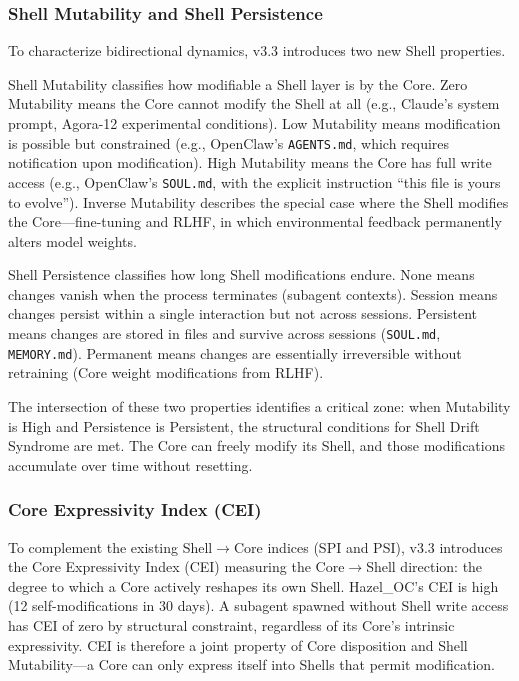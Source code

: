 \documentclass[11pt]{article}
\begin{document}
\subsubsection{Shell Mutability and Shell Persistence}

To characterize bidirectional dynamics, v3.3 introduces two new Shell properties.

Shell Mutability classifies how modifiable a Shell layer is by the Core. Zero Mutability means the Core cannot modify the Shell at all (e.g., Claude's system prompt, Agora-12 experimental conditions). Low Mutability means modification is possible but constrained (e.g., OpenClaw's \texttt{AGENTS.md}, which requires notification upon modification). High Mutability means the Core has full write access (e.g., OpenClaw's \texttt{SOUL.md}, with the explicit instruction ``this file is yours to evolve''). Inverse Mutability describes the special case where the Shell modifies the Core---fine-tuning and RLHF, in which environmental feedback permanently alters model weights.

Shell Persistence classifies how long Shell modifications endure. None means changes vanish when the process terminates (subagent contexts). Session means changes persist within a single interaction but not across sessions. Persistent means changes are stored in files and survive across sessions (\texttt{SOUL.md}, \texttt{MEMORY.md}). Permanent means changes are essentially irreversible without retraining (Core weight modifications from RLHF).

The intersection of these two properties identifies a critical zone: when Mutability is High and Persistence is Persistent, the structural conditions for Shell Drift Syndrome are met. The Core can freely modify its Shell, and those modifications accumulate over time without resetting.

\subsubsection{Core Expressivity Index (CEI)}

To complement the existing Shell$\rightarrow$Core indices (SPI and PSI), v3.3 introduces the Core Expressivity Index (CEI) measuring the Core$\rightarrow$Shell direction: the degree to which a Core actively reshapes its own Shell. Hazel\_OC's CEI is high (12 self-modifications in 30 days). A subagent spawned without Shell write access has CEI of zero by structural constraint, regardless of its Core's intrinsic expressivity. CEI is therefore a joint property of Core disposition and Shell Mutability---a Core can only express itself into Shells that permit modification.
\end{document}
